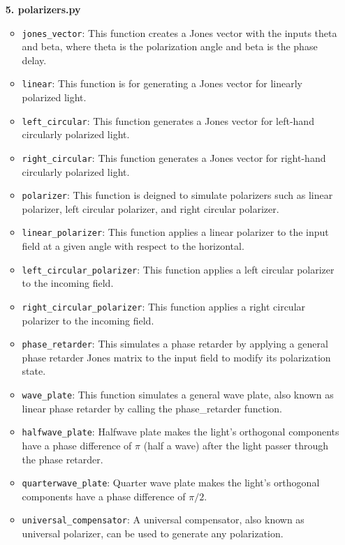 \documentclass[a4paper,12pt]{report}
\begin{document}
\begin{itemize}[itemsep=1em, left=0pt]
    \item[\large\bfseries 5. polarizers.py]
      \begin{itemize}[itemsep=0.5em]
        \item \texttt{jones\_vector}: This function creates a Jones vector with the inputs theta and beta, where theta is the polarization angle and beta is the phase delay.
        \item \texttt{linear}: This function is for generating a Jones vector for linearly polarized light.
        \item \texttt{left\_circular}: This function generates a Jones vector for left-hand circularly polarized light.
        \item \texttt{right\_circular}: This function generates a Jones vector for right-hand circularly polarized light.
        \item \texttt{polarizer}: This function is deigned to simulate polarizers such as linear polarizer, left circular polarizer, and right circular polarizer.
        \item \texttt{linear\_polarizer}: This function applies a linear polarizer to the input field at a given angle with respect to the horizontal.
        \item \texttt{left\_circular\_polarizer}: This function applies a left circular polarizer to the incoming field.
        \item \texttt{right\_circular\_polarizer}: This function applies a right circular polarizer to the incoming field.
        \item \texttt{phase\_retarder}: This simulates a phase retarder by applying a general phase retarder Jones matrix to the input field to modify its polarization state.
        \item \texttt{wave\_plate}: This function simulates a general wave plate, also known as linear phase retarder by calling the phase\_retarder function.
        \item \texttt{halfwave\_plate}: Halfwave plate makes the light's orthogonal components have a phase difference of $\pi$ (half a wave) after the light passer through the phase retarder.
        \item \texttt{quarterwave\_plate}: Quarter wave plate makes the light's orthogonal components have a phase difference of $\pi/2$.
        \item \texttt{universal\_compensator}: A universal compensator, also known as universal polarizer, can be used to generate any polarization.
      \end{itemize}
  

\end{itemize}
\end{document}

